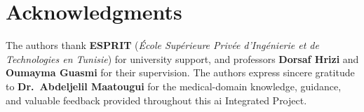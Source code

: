 \documentclass[10pt,twocolumn,a4paper]{article}
\begin{document}
\section*{Acknowledgments}

The authors thank \textbf{ESPRIT} (\textit{École Supérieure Privée
d'Ingénierie et de Technologies en Tunisie}) for university support,
and professors \textbf{Dorsaf Hrizi} and \textbf{Oumayma Guasmi} for
their supervision.  The authors express sincere gratitude to
\textbf{Dr.~Abdeljelil Maatougui} for the medical-domain knowledge,
guidance, and valuable feedback provided throughout this \gls{ai}
Integrated Project.


\end{document}
